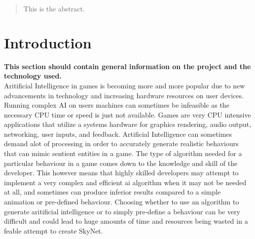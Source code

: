 \documentclass[12pt,a4paper,titlepage]{article}
\begin{document}


\begin{abstract}
This is the abstract.
\end{abstract}

\tableofcontents

\newpage

\listoftables

\newpage

\listoffigures

\newpage

\section{Introduction}
\textbf{This section should contain general information on the project and the technology used.}\\

Aritificial Intelligence in games is becoming more and more popular due to new advancements in technology and increasing hardware resources on user devices. Running complex AI on users machines can sometimes be infeasible as the necessary CPU time or speed is just not available. Games are very CPU intensive applications that utilize a systems hardware for graphics rendering, audio output, networking, user inputs, and feedback. Artificial Intelligence can sometimes demand alot of processing in order to accurately generate realistic behaviours that can mimic sentient entities in a game. The type of algorithm needed for a particular behaviour in a game comes down to the knowledge and skill of the developer. This however means that highly skilled developers may attempt to implement a very complex and efficient ai algorithm when it may not be needed at all, and sometimes can produce inferior results compared to a simple animation or pre-defined behaviour. Choosing whether to use an algorithm to generate aritificial intelligence or to simply pre-define a behaviour can be very difficult and could lead to huge amounts of time and resources being wasted in a feable attempt to create SkyNet\cite{skynet}. 
\end{document}
